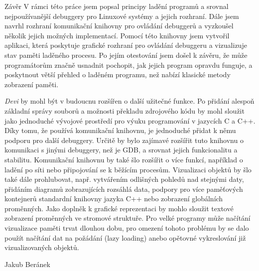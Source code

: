 \documentclass[czech,bachelor,male,python,dept460,hidelinks]{diploma}						%
\newcommand{\parspace}[1][]{
	\ifthenelse{\isempty{#1}}{\vspace{5mm}}{\vspace{#1}}
	\par
}
\begin{document}
\begin{section}{Závěr}
\label{sec:Conclusion}
	V rámci této práce jsem popsal principy ladění programů a srovnal nejpoužívanější debuggery pro Linuxové systémy a jejich rozhraní. Dále jsem
	navrhl rozhraní komunikační knihovny pro ovládání debuggerů a vyzkoušel několik jejich možných implementací. Pomocí této knihovny jsem
	vytvořil aplikaci, která poskytuje grafické rozhraní pro ovládání debuggeru a vizualizuje stav paměti laděného procesu. Po jejím otestování jsem
	došel k závěru, že může programátorům značně usnadnit pochopit, jak jejich program opravdu funguje, a poskytnout větší přehled o laděném programu, než
	nabízí klasické metody zobrazení paměti.

	\parspace \textit{Devi} by mohl být v budoucnu rozšířen o další užitečné funkce. Po přidání alespoň základní správy souborů a možnosti překladu
	zdrojového kódu by mohl sloužit jako jednoduché vývojové prostředí pro výuku programování v jazycích C a C++.
	Díky tomu, že používá komunikační knihovnu, je jednoduché přidat k němu podporu pro další debuggery. Určitě by bylo
	zajímavé rozšířit tuto knihovnu o komunikaci s jinými debuggery, než je GDB, a srovnat jejich funkcionalitu a stabilitu.
	Komunikační knihovnu by také šlo rozšířit o více funkcí, například o ladění po síti nebo připojování se k běžícím procesům.
	Vizualizaci objektů by šlo také dále prohlubovat, např. vytvářením odlišných pohledů nad stejnými daty, přidáním diagramů zobrazujících rozsáhlá data,
	podpory pro více paměťových kontejnerů standardní knihovny jazyka C++ nebo zobrazení globálních proměnných.
	Jako doplněk k grafické reprezentaci by mohlo sloužit textové zobrazení proměnných ve stromové struktuře.
	Pro velké programy může načítání vizualizace paměti trvat dlouhou dobu, pro omezení tohoto problému by se dalo použít načítání dat na požádání
	(lazy loading) anebo opětovné vykreslování již vizualizovaných objektů.
\end{section}

\bigskip
\begin{flushright}
Jakub Beránek
\end{flushright}

\printbibheading[title=Literatura, heading=bibintoc]
\printbibliography[heading=none]
\end{document}

